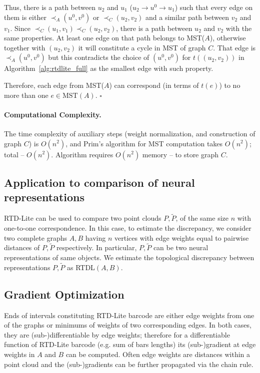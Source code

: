 \documentclass[twoside]{article}
\begin{document}
Thus, there is a path between $u_2$ and $u_1$ ($u_2 \rightarrow u^0 \rightarrow u_1$) such that every edge on them is either $\prec_A (u^0, v^0)$ or $\prec_C (u_2, v_2)$ and a similar path between $v_2$ and $v_1$. Since $\prec_C (u_1, v_1) \prec_C (u_2, v_2)$, there is a path between $u_2$ and $v_2$ with the same properties. At least one edge on that path belongs to MST($A$), otherwise together with $(u_2, v_2)$ it will constitute a cycle in MST of graph $C$. That edge is $\prec_A (u^0, v^0)$ but this contradicts the choice of $(u^0, v^0)$ for $t((u_2, v_2))$ in Algorithm~\ref{alg:rtdlite_full} as the smallest edge with such property. 

Therefore, each edge from MST($A$) can correspond (in terms of $t(e)$) to no more than one $e \in \text{MST}(A)$.
\hfill$\square$

\paragraph{Computational Complexity.}
The time complexity of auxiliary steps (weight normalization, and construction of graph $C$) is $O(n^2)$, and Prim's algorithm for MST computation takes $O(n^2)$; total -- $O(n^2)$. Algorithm requires $O(n^2)$ memory -- to store graph $C$.

\subsection{Application to comparison of neural representations}

RTD-Lite can be used to compare two point clouds $P, \tilde{P}$, of the same size $n$ with one-to-one correspondence.
In this case, to estimate the discrepancy, we consider two complete graphs $A, B$ having $n$ vertices with edge weights equal to pairwise distances of $P, \tilde{P}$ respectively.
In particular, $P, \tilde{P}$ can be two neural representations of same objects.
We estimate the topological discrepancy between representations $P,\tilde{P}$ as RTDL$(A,B)$.

\subsection{Gradient Optimization}

 Ends of intervals constituting RTD-Lite barcode are either edge weights from one of the graphs or minimums of weights of two corresponding edges. In both cases, they are (sub-)differentiable by edge weights; therefore for a differentiable function of RTD-Lite barcode (e.g. sum of bars lengths) its (sub-)gradient at edge weights in $A$ and $B$ can be computed. Often edge weights are distances within a point cloud and the (sub-)gradients can be further propagated via the chain rule.
 
\end{document}

